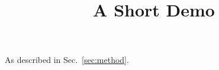\documentclass[article]{jss}
\title{A Short Demo}
\begin{document}
As described in Sec.~\ref{sec:method}.
\end{document}
